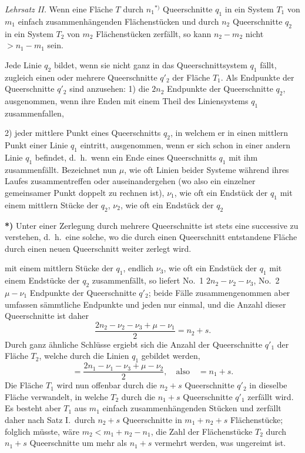 \documentclass{article}
\begin{document}
\emph{Lehrsatz II.} Wenn eine Fläche $T$ durch $n_1{}^{*)}$ Queerschnitte $q_1$ in ein System $T_1$ von $m_1$ einfach zusammenhängenden Flächenstücken und durch $n_2$ Queerschnitte $q_2$ in ein System $T_2$ von $m_2$ Flächenstücken zerfällt, so kann $n_2 - m_2$ nicht $> n_1 - m_1$ sein.

Jede Linie $q_2$ bildet, wenn sie nicht ganz in das Queerschnittsystem $q_1$ fällt, zugleich einen oder mehrere Queerschnitte $q'_2$ der Fläche $T_1$. Als Endpunkte der Queerschnitte $q'_2$ sind anzusehen:
1) die $2n_2$ Endpunkte der Queerschnitte $q_2$, ausgenommen, wenn ihre Enden mit einem Theil des Liniensystems $q_1$ zusammenfallen,


2) jeder mittlere Punkt eines Queerschnitts $q_2$, in welchem er in einen mittlern Punkt einer Linie $q_1$ eintritt, ausgenommen, wenn er sich schon in einer andern Linie $q_1$ befindet, d.\ h.\ wenn ein Ende eines Queerschnitts $q_1$ mit ihm zusammenfällt.
Bezeichnet nun $\mu$, wie oft Linien beider Systeme während ihres Laufes zusammentreffen oder auseinandergehen (wo also ein einzelner gemeinsamer Punkt doppelt zu rechnen ist), $\nu_1$, wie oft ein Endstück der $q_1$ mit einem mittlern Stücke der $q_2$, $\nu_2$, wie oft ein Endstück der $q_2$

\textbf{*)} Unter einer Zerlegung durch mehrere Queerschnitte ist stets eine successive zu verstehen, d.\ h.\ eine solche, wo die durch einen Queerschnitt entstandene Fläche durch einen neuen Queerschnitt weiter zerlegt wird.

mit einem mittlern Stücke der $q_1$, endlich $\nu_3$, wie oft ein Endstück der $q_1$ mit einem Endstücke der $q_2$ zusammenfällt, so liefert No.\ 1 $2n_2 - \nu_2 - \nu_3$, No.\ 2 $\mu - \nu_1$ Endpunkte der Queerschnitte $q'_2$; beide Fälle zusammengenommen aber umfassen sämmtliche Endpunkte und jeden nur einmal, und die Anzahl dieser Queerschnitte ist daher
\[
\frac{2n_2 - \nu_2 - \nu_3 + \mu - \nu_1}{2} = n_2 + s.
\]
Durch ganz ähnliche Schlüsse ergiebt sich die Anzahl der Queerschnitte $q'_1$ der Fläche $T_2$, welche durch die Linien $q_1$ gebildet werden,
\[
= \frac{2n_1 - \nu_1 - \nu_3 + \mu - \nu_2}{2}, \quad \text{also} \quad = n_1 + s.
\]
Die Fläche $T_1$ wird nun offenbar durch die $n_2 + s$ Queerschnitte $q'_2$ in dieselbe Fläche verwandelt, in welche $T_2$ durch die $n_1 + s$ Queerschnitte $q'_1$ zerfällt wird. Es besteht aber $T_1$ aus $m_1$ einfach zusammenhängenden Stücken und zerfällt daher nach Satz I.\ durch $n_2 + s$ Queerschnitte in $m_1 + n_2 + s$ Flächenstücke; folglich müsste, wäre $m_2 < m_1 + n_2 - n_1$, die Zahl der Flächenstücke $T_2$ durch $n_1 + s$ Queerschnitte um mehr als $n_1 + s$ vermehrt werden, was ungereimt ist.
\end{document}
